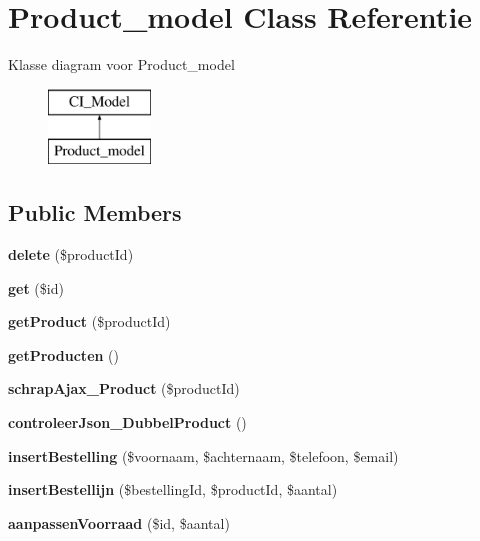 \hypertarget{class_product__model}{}\section{Product\+\_\+model Class Referentie}
\label{class_product__model}
Klasse diagram voor Product\+\_\+model\begin{figure}[H]
\begin{center}
\leavevmode
\includegraphics[height=2.000000cm]{class_product__model}
\end{center}
\end{figure}
\subsection*{Public Members}
\begin{DoxyCompactItemize}
\item 
\mbox{\label{class_product__model_a16bdb278f98b81556f90a9b6f1e176f5}} 
{\bfseries delete} (\$product\+Id)
\item 
\mbox{\label{class_product__model_a50e3bfb586b2f42932a6a93f3fbb0828}} 
{\bfseries get} (\$id)
\item 
\mbox{\label{class_product__model_a38439fc801560d95771a93c99227d6a4}} 
{\bfseries get\+Product} (\$product\+Id)
\item 
\mbox{\label{class_product__model_a47f5b103901c86e37f62474e94c7c459}} 
{\bfseries get\+Producten} ()
\item 
\mbox{\label{class_product__model_afda6e6f082eac20142c8f38a4377540c}} 
{\bfseries schrap\+Ajax\+\_\+\+Product} (\$product\+Id)
\item 
\mbox{\label{class_product__model_ad5ce40d8b615469d8317b6f0dcb71b2b}} 
{\bfseries controleer\+Json\+\_\+\+Dubbel\+Product} ()
\item 
\mbox{\label{class_product__model_a0e44f9eea236af57923b9c7c3421d438}} 
{\bfseries insert\+Bestelling} (\$voornaam, \$achternaam, \$telefoon, \$email)
\item 
\mbox{\label{class_product__model_a997aa5d3fbf928aeb11f030a05382268}} 
{\bfseries insert\+Bestellijn} (\$bestelling\+Id, \$product\+Id, \$aantal)
\item 
\mbox{\label{class_product__model_a91099f042ef854addb75f75c55a77a06}} 
{\bfseries aanpassen\+Voorraad} (\$id, \$aantal)
\end{DoxyCompactItemize}


